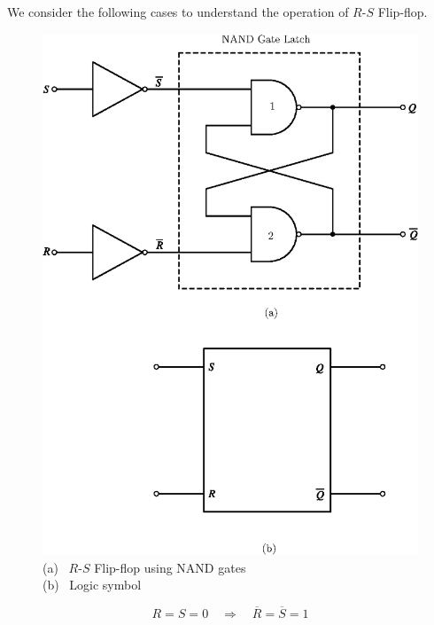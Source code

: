 We consider the following cases to understand the operation of $R$-$S$ Flip-flop.
\begin{figure}
\centering
\includegraphics{chap6/fig138.eps}

\medskip
\caption{(a)~ $R$-$S$ Flip-flop using NAND gates\\ (b)~ Logic symbol\qquad\qquad~}\label{fig6.37}
\end{figure}



$$
R=S=0\quad\Rightarrow\quad \overline{R}=\overline{S}=1
$$

